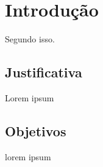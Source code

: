 
\chapter{Introdução}
\label{introducao}

Segundo  isso.

\section{Justificativa}
\label{justificativa}

Lorem ipsum

\section{Objetivos}
\label{objetivos}

lorem ipsum
